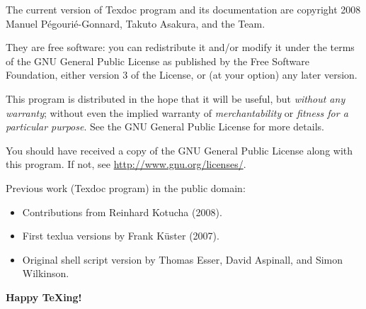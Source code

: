 \documentclass[draft]{texdoc-doc}
\begin{document}
The current version of Texdoc program and its documentation are copyright 2008
Manuel Pégourié-Gonnard, Takuto Asakura, and the {\TL} Team.

They are free software: you can redistribute it and/or modify it under the
terms of the GNU General Public License as published by the Free Software
Foundation, either version 3 of the License, or (at your option) any later
version.

This program is distributed in the hope that it will be useful, but
\emph{without any warranty}; without even the implied warranty of
\emph{merchantability} or \emph{fitness for a particular purpose}. See the
GNU General Public License for more details.

You should have received a copy of the GNU General Public License along with
this program. If not, see \url{http://www.gnu.org/licenses/}.

\bigskip

Previous work (Texdoc program) in the public domain:
%
\begin{itemize}
\item Contributions from Reinhard Kotucha (2008).
\item First texlua versions by Frank K\"uster (2007).
\item Original shell script version by Thomas Esser, David Aspinall, and Simon
  Wilkinson.
\end{itemize}

\bigskip

\begin{center}
\Large\bfseries
Happy {\TeX}ing!
\end{center}
\end{document}
